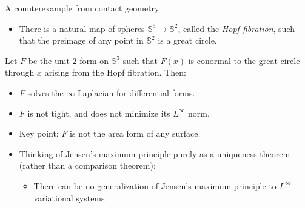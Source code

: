 \documentclass[10pt]{beamer}
\begin{document}
\begin{frame}{A counterexample from contact geometry}
    \begin{itemize}
        \item There is a natural map of spheres $\mathbb S^3 \to \mathbb S^2$, called the \emph{Hopf fibration}, such that the preimage of any point in $\mathbb S^2$ is a great circle. 
    \end{itemize}

    \begin{example}
    Let $F$ be the unit $2$-form on $\mathbb S^3$ such that $F(x)$ is conormal to the great circle through $x$ arising from the Hopf fibration.
    Then: 
\begin{itemize}
    \item $F$ solves the $\infty$-Laplacian for differential forms.
    \item $F$ is not tight, and does not minimize its $L^\infty$ norm.
\end{itemize}
\end{example}

\begin{itemize}
\item Key point: $F$ is not the area form of any surface.  
\item Thinking of Jensen's maximum principle purely as a uniqueness theorem (rather than a comparison theorem):  
\begin{itemize}
\item There can be no generalization of Jensen's maximum principle to $L^\infty$ variational systems.
\end{itemize}
\end{itemize}
\end{frame}
\end{document}
